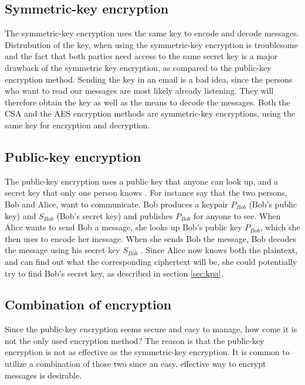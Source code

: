 \subsection{Symmetric-key encryption}\label{ch:symmetric}
The symmetric-key encryption uses the same key to encode and decode 
messages. Distrubution of the key, when using the symmetric-key 
encryption is troublesome and the fact that both parties need access to 
the same secret key is a major drawback of the symmetric key 
encryption, as compared to the public-key encryption method. Sending 
the key in an email is a bad idea, since the persons who want to read 
our messages are most likely already listening. They will therefore 
obtain the key as well as the means to decode the messages. Both the 
CSA and the AES encryption methods are symmetric-key encryptions, using 
the same key for encryption and decryption.


\subsection{Public-key encryption}\label{ch:public}
The public-key encryption uses a public key that anyone can look up, 
and a secret key that only one person knows 
\citep[pp. 25--32]{Simmons:1992}. For instance say that the two 
persons, Bob and Alice, want to communicate. Bob produces a keypair 
\(P_{Bob}\) (Bob’s public key) and \(S_{Bob}\) (Bob’s secret key) and 
publishes \(P_{Bob}\) for anyone to see. When Alice wants to send Bob a 
message, she looks up Bob’s public key \(P_{Bob}\), which she then uses 
to encode her message. When she sends Bob the message, Bob decodes the 
message using his secret key \(S_{Bob}\) \citep{Schneier:2003}. 
Since Alice now knows both the plaintext, and can find out what the 
corresponding ciphertext will be, she could potentially try to find 
Bob's secret key, as described in section \ref{sec:kpa}.

\subsection{Combination of encryption}
Since the public-key encryption seems secure and easy to manage, how 
come it is not the only used encryption method? The reason is that the 
public-key encryption is not as effective as the symmetric-key 
encryption. It is common to utilize a combination of those two since an 
easy, effective way to encrypt messages is desirable.

